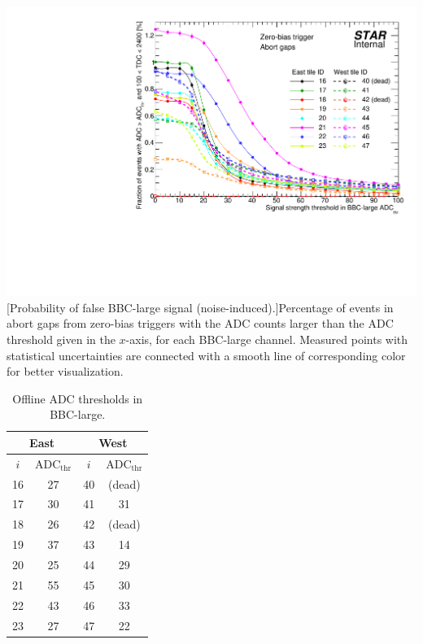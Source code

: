 \begin{table}%
	\begin{minipage}{0.65\linewidth}
		\centering
		\includegraphics[width=\linewidth]{graphics/eventSelection/bbc/BbbLargeThreshold.pdf}
		[Probability of false BBC-large signal (noise-induced).]{Percentage of events in abort gaps from zero-bias triggers with the ADC counts larger than the ADC threshold given in the $x$-axis, for each BBC-large channel. Measured points with statistical uncertainties are connected with a smooth line of corresponding color for better visualization.}
		\label{fig:bbcLargeThresholds}
	\end{minipage}\hfill
	\begin{minipage}{0.3\linewidth}
		\centering
		\begin{tabular}{c|c||c|c}
			\multicolumn{2}{c||}{East} & \multicolumn{2}{c}{West} \\ \hline
			$i$  & $\text{ADC}_{\text{thr}}$ & $i$  & $\text{ADC}_{\text{thr}}$ \\ \hline
			16 & 27 & 40 & (dead) \\
			17 & 30 & 41 & 31 \\
			18 & 26 & 42 & (dead) \\
			19 & 37 & 43 & 14 \\
			20 & 25 & 44 & 29 \\
			21 & 55 & 45 & 30 \\
			22 & 43 & 46 & 33 \\
			23 & 27 & 47 & 22 \\
		\end{tabular}
		\caption[Offline ADC thresholds in BBC-large.]{Offline ADC thresholds in BBC-large.\newline\newline\newline\newline\newline\newline\newline\newline}
		\label{tab:bbcLargeThresholds}
	\end{minipage}

\end{table}


